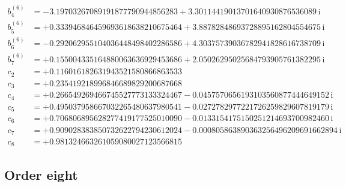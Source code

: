 {\begin{align*}
b^{(6)}_{4} &= -3.19703267089191877790944856283 + 3.30114419013701640930876536089\,\mathrm{i}\\
b^{(6)}_{5} &= +0.333946846459693618638210675464 + 3.88782848693728895162804554675\,\mathrm{i}\\
b^{(6)}_{6} &= -0.292062955104036448498402286586 + 4.30375739036782941828616738709\,\mathrm{i}\\
b^{(6)}_{7} &= +0.155004335164880063636929453686 + 2.05026295025684793905761382295\,\mathrm{i}\\[1mm]
c_{2} &= +0.116016182631943521580866863533\\
c_{3} &= +0.235419218996846689829200687668\\
c_{4} &= +0.266549269466745527773133324467 - 0.0457570656193103560877444649152\,\mathrm{i}\\
c_{5} &= +0.495037958667032265480637980541 - 0.0272782977221726259829607819179\,\mathrm{i}\\
c_{6} &= +0.706806895628277419177525010090 - 0.0133154175150251214693700982460\,\mathrm{i}\\
c_{7} &= +0.909028383850732622794230612024 - 0.000805863890363256496209691662894\,\mathrm{i}\\
c_{8} &= +0.981324663261059080027123566815
\end{align*}
}

\subsection*{Order eight}

